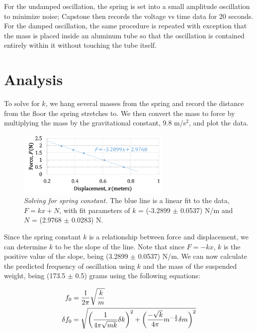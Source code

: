 \documentclass[twoside,twocolumn]{article}
\begin{document}
\hfill

\noindent For the undamped oscillation, the spring is set into a small amplitude oscillation to minimize noise; Capstone then records the voltage vs time data for 20 seconds. For the damped oscillation, the same procedure is repeated with exception that the mass is placed inside an aluminum tube so that the oscillation is contained entirely within it without touching the tube itself.


\section{Analysis}

To solve for $k$, we hang several masses from the spring and record the distance from the floor the spring stretches to. We then convert the mass to force by multiplying the mass by the gravitational constant, 9.8 m/s$^2$, and plot the data.

\begin{figure}[!htbp]
    \centering
    \includegraphics[width=2.9in]{SpringConst.png}
    \caption{\textit{Solving for spring constant.} The blue line is a linear fit to the data, $F = kx + N$, with fit parameters of $k$ = (-3.2899 $\pm$ 0.0537) N/m and $N$ = (2.9768 $\pm$ 0.0283) N.}
\end{figure}

\noindent Since the spring constant $k$ is a relationship between force and displacement, we can determine $k$ to be the slope of the line. Note that since $F = -kx$, $k$ is the positive value of the slope, being (3.2899 $\pm$ 0.0537) N/m. We can now calculate the predicted frequency of oscillation using $k$ and the mass of the suspended weight, being (173.5 $\pm$ 0.5) grams using the following equations:

\footnotesize
\begin{align}
f_0 &= \frac{1}{2\pi}\sqrt{\frac{k}{m}} \\
\delta f_0 &= \sqrt{\bigg (\frac{1}{4\pi\sqrt{mk}}\delta k \bigg)^2 + \bigg ( \frac{-\sqrt{k}}{4\pi}m\textsuperscript{$-\frac{3}{2}$} \delta m \bigg )^2}
\end{align}
\normalsize
\end{document}
